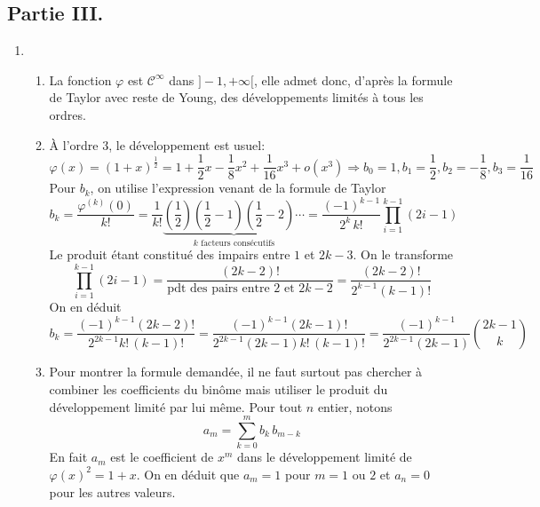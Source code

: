 \subsection*{Partie III.}
\begin{enumerate}
  \item 
\begin{enumerate}
\item La fonction $\varphi$ est $\mathcal{C}^{\infty}$ dans $]-1,+\infty[$, elle admet donc, d'après la formule de Taylor avec reste de Young, des développements limités à tous les ordres.

\item \`A l'ordre $3$, le développement est usuel:
\begin{displaymath}
\varphi(x) = (1+x)^{\frac{1}{2}} = 1 + \frac{1}{2}x -\frac{1}{8}x^2 + \frac{1}{16}x^3 + o(x^3)  
\Rightarrow b_0=1, b_1=\frac{1}{2}, b_2=-\frac{1}{8}, b_3=\frac{1}{16}
\end{displaymath}
Pour $b_k$, on utilise l'expression venant de la formule de Taylor
\begin{displaymath}
b_k = \frac{\varphi^{(k)}(0)}{k!}
= \frac{1}{k!}\underset{k \text{ facteurs consécutifs}}{\underbrace{(\frac{1}{2})(\frac{1}{2}-1)(\frac{1}{2}-2) \cdots }}
= \frac{(-1)^{k-1}}{2^k\,k!}\prod_{i=1}^{k-1}(2i-1)
\end{displaymath}
Le produit étant constitué des impairs entre $1$ et $2k-3$. On le transforme
\begin{displaymath}
\prod_{i=1}^{k-1}(2i-1)
= \frac{(2k-2)!}{\text{pdt des pairs entre $2$ et $2k-2$}}
= \frac{(2k-2)!}{2^{k-1}(k-1)!}
\end{displaymath}
On en déduit
\begin{displaymath}
  b_k = \frac{(-1)^{k-1} (2k-2)!}{2^{2k-1}k!\,(k-1)!}
  = \frac{(-1)^{k-1} (2k-1)!}{2^{2k-1}(2k-1)k!\,(k-1)!}
  = \frac{(-1)^{k-1}}{2^{2k-1}(2k-1)}\binom{2k-1}{k}
\end{displaymath}

\item Pour montrer la formule demandée, il ne faut surtout pas chercher à combiner les coefficients du binôme mais utiliser le produit du développement limité par lui même. Pour tout $n$ entier, notons
\begin{displaymath}
a_m = \sum_{k=0}^{m}b_k\,b_{m-k}  
\end{displaymath}
En fait $a_m$ est le coefficient de $x^m$ dans le développement limité de $\varphi(x)^2 = 1+x$. On en déduit que $a_m=1$ pour $m=1$ ou $2$ et $a_n=0$ pour les autres valeurs.
\end{enumerate}


\end{enumerate}
